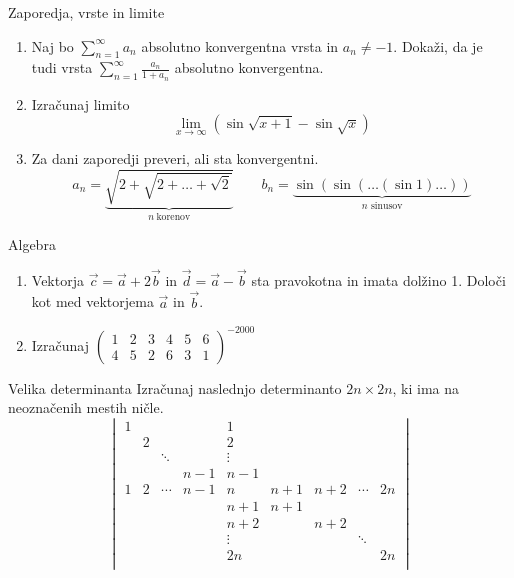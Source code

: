 \begin{frame}{Zaporedja, vrste in limite}
	\begin{enumerate}
		\item 
		Naj bo $\sum_{n=1}^{\infty} a_n$ absolutno konvergentna vrsta in $a_n \ne -1$.
		Dokaži, da je tudi vrsta $\sum_{n=1}^\infty \frac{a_n}{1+a_n}$
		absolutno konvergentna.

		\item
		Izračunaj limito
		$$ \lim_{x \rightarrow \infty}(\sin\sqrt{x+1} - \sin\sqrt{x}) $$

		\item
		Za dani zaporedji preveri, ali sta konvergentni.
		$$ 
		a_n = \underbrace{\sqrt{2+\sqrt{2+\dots+\sqrt{2}}}}_{n~\text{korenov}} \qquad
		b_n = \underbrace{\sin(\sin(\dots(\sin 1)\dots))}_{n \text{ sinusov}}
		$$
	\end{enumerate}
\end{frame}

\begin{frame}{Algebra}
	\begin{enumerate}
		\item
		Vektorja $\vec{c}=\vec{a}+2\vec{b}$ in $\vec{d}=\vec{a}-\vec{b}$
		sta pravokotna in imata dolžino 1. Določi kot med vektorjema $\vec{a}$ in $\vec{b}$.
		\item 
		Izračunaj
		$
		\begin{pmatrix}
			1 & 2 & 3 & 4 & 5 & 6 \\
			4 & 5 & 2 & 6 & 3 & 1
		\end{pmatrix}^{-2000}
		$
	\end{enumerate}
\end{frame}

\begin{frame}{Velika determinanta}
	Izračunaj naslednjo determinanto $2n \times 2n$, ki ima na neoznačenih mestih ničle.
	$$\begin{vmatrix}
		1 & & & & 1\\
		& 2 & & & 2\\
		& & \ddots & & \vdots\\
		& & & n-1 & n-1\\
		1 & 2 & \cdots & n-1 & n & n+1 & n+2 & \cdots &2n\\
		& & & & n+1 & n+1\\
		& & & & n+2 &  & n+2\\
		& & & & \vdots &  & & \ddots\\
		& & & & 2n&  & & & 2n\\
	\end{vmatrix}$$
\end{frame}

